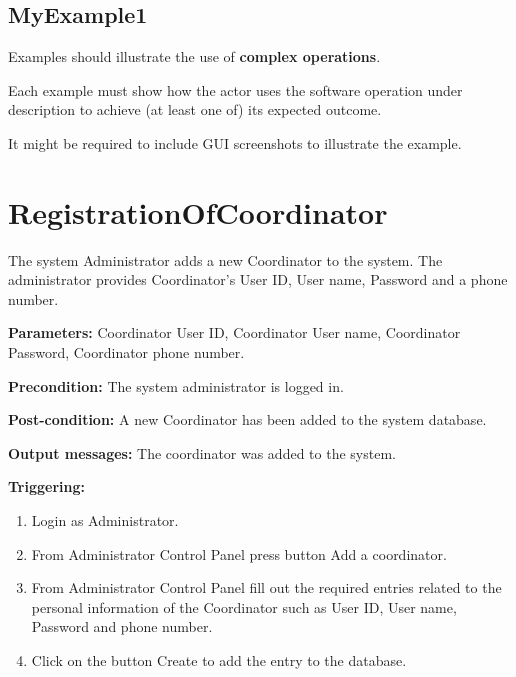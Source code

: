  
\subsection{MyExample1}
Examples should illustrate the use of \textbf{complex operations}.

Each example must show how the actor uses the software operation under
description to achieve (at least one of) its expected outcome.

It might be required to include GUI screenshots to illustrate the example.



\section{RegistrationOfCoordinator}
\label{operation:RegistrationOfCoordinator}
The system Administrator adds a new Coordinator to the system. The administrator 
provides Coordinator's User ID, User name, Password and a phone number.

\begin{description}

\item \textbf{Parameters:} Coordinator User ID, Coordinator User name,
Coordinator Password, Coordinator phone number.
\item \textbf{Precondition:} The system administrator is logged in.
\item \textbf{Post-condition:} A new Coordinator has been added to the system
database.
\item \textbf{Output messages:} The coordinator was added to the system.

\item \textbf{Triggering:}
\begin{enumerate}
\item Login as Administrator.
\item From Administrator Control Panel press button Add a coordinator.
\item From Administrator Control Panel fill out the required entries related to the personal information of the Coordinator such as User ID, User name, Password and phone number.
\item Click on the button Create to add the entry to the database.
\end{enumerate}
 
\end{description}


